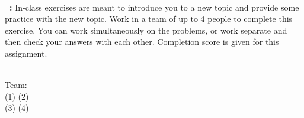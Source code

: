 \footnotesize
~\\ 
\textbf{\laChapter\ \laType: } In-class exercises are meant to introduce you to a new topic
and provide some practice with the new topic. Work in a team of up to 4 people to complete this exercise.
You can work simultaneously on the problems, or work separate and then check your answers with each other.
Completion score is given for this assignment.

~\\
Team:\\
(1) \tab[6cm] (2) \\
(3) \tab[6cm] (4)

\hrulefill
\normalsize 
